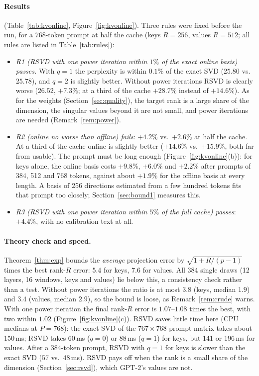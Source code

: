 \documentclass[10pt]{article}
\theoremstyle{plain}
\theoremstyle{definition}
\theoremstyle{remark}
\newcommand{\rl}[1]{\textsf{#1}}%
\begin{document}
\paragraph{Results} (Table~\ref{tab:kvonline}, Figure~\ref{fig:kvonline}). Three rules were fixed before the run, for a 768-token prompt at half the cache (keys $R=256$, values $R=512$; all rules are listed in Table~\ref{tab:rules}):
\begin{itemize}[leftmargin=2em,itemsep=1pt]
\item \emph{\rl{R1} (RSVD with one power iteration within $1\%$ of the exact online basis) passes.} With $q=1$ the perplexity is within $0.1\%$ of the exact SVD ($25.80$ vs.\ $25.78$), and $q=2$ is slightly better. Without power iterations RSVD is clearly worse ($26.52$, $+7.3\%$; at a third of the cache $+28.7\%$ instead of $+14.6\%$). As for the weights (Section~\ref{sec:quality}), the target rank is a large share of the dimension, the singular values beyond it are not small, and power iterations are needed (Remark~\ref{rem:power}).
\item \emph{\rl{R2} (online no worse than offline) fails}: $+4.2\%$ vs.\ $+2.6\%$ at half the cache. At a third of the cache online is slightly better ($+14.6\%$ vs.\ $+15.9\%$, both far from usable). The prompt must be long enough (Figure~\ref{fig:kvonline}(b)): for keys alone, the online basis costs $+9.8\%$, $+6.0\%$ and $+2.2\%$ after prompts of 384, 512 and 768 tokens, against about $+1.9\%$ for the offline basis at every length. A basis of 256 directions estimated from a few hundred tokens fits that prompt too closely; Section~\ref{sec:bound1} measures this.
\item \emph{\rl{R3} (RSVD with one power iteration within $5\%$ of the full cache) passes}: $+4.4\%$, with no calibration text at all.
\end{itemize}

\paragraph{Theory check and speed.}
Theorem~\ref{thm:exp} bounds the \emph{average} projection error by $\sqrt{1+R/(p-1)}$ times the best rank-$R$ error: $5.4$ for keys, $7.6$ for values. All 384 single draws (12 layers, 16 windows, keys and values) lie below this, a consistency check rather than a test. Without power iterations the ratio is at most $3.8$ (keys, median $1.9$) and $3.4$ (values, median $2.9$), so the bound is loose, as Remark~\ref{rem:crude} warns. With one power iteration the final rank-$R$ error is $1.07$--$1.08$ times the best, with two within $1.02$ (Figure~\ref{fig:kvonline}(c)). RSVD saves little time here (CPU medians at $P=768$): the exact SVD of the $767\times768$ prompt matrix takes about 150\,ms; RSVD takes 60\,ms ($q=0$) or 88\,ms ($q=1$) for keys, but 141 or 196\,ms for values. After a 384-token prompt, RSVD with $q=1$ for keys is slower than the exact SVD ($57$ vs.\ $48$\,ms). RSVD pays off when the rank is a small share of the dimension (Section~\ref{sec:rsvd}), which GPT-2's values are not.
\end{document}
